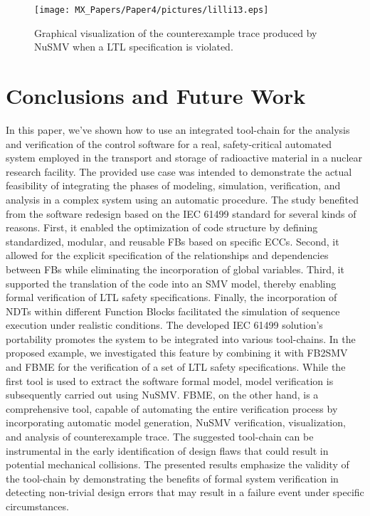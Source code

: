 \begin{bibunit}
\begin{figure}[t!]
    \centering
    \texttt{[image: MX\_Papers/Paper4/pictures/lilli13.eps]}
    \caption{Graphical visualization of the counterexample trace produced by NuSMV when a LTL specification is violated.} 
    \label{fig:counterexample}
\end{figure}

\section{Conclusions and Future Work}
\label{sec:conclusion}
In this paper, we've shown how to use an integrated tool-chain for the analysis and verification of the control software for a real, safety-critical automated system employed in the transport and storage of radioactive material in a nuclear research facility. 
The provided use case was intended to demonstrate the actual feasibility of integrating the phases of modeling, simulation, verification, and analysis in a complex system using an automatic procedure.
The study benefited from the software redesign based on the IEC 61499 standard for several kinds of reasons.
First, it enabled the optimization of code structure by defining standardized, modular, and reusable FBs based on specific ECCs. Second, it allowed for the explicit specification of the relationships and dependencies between FBs while eliminating the incorporation of global variables. Third, it supported the translation of the code into an SMV model, thereby enabling formal verification of LTL safety specifications. Finally, the incorporation of NDTs within different Function Blocks facilitated the simulation of sequence execution under realistic conditions. 
The developed IEC 61499 solution's portability promotes the system to be integrated into various tool-chains. In the proposed example, we investigated this feature by combining it with FB2SMV and FBME for the verification of a set of LTL safety specifications. 
While the first tool is used to extract the software formal model, model verification is subsequently carried out using NuSMV. FBME, on the other hand, is a comprehensive tool, capable of automating the entire verification process by incorporating automatic model generation, NuSMV verification, visualization, and analysis of counterexample trace.
The suggested tool-chain can be instrumental in the early identification of design flaws that could result in potential mechanical collisions. The presented results emphasize the validity of the tool-chain by demonstrating the benefits of formal system verification in detecting non-trivial design errors that may result in a failure event under specific circumstances.

\end{bibunit}
